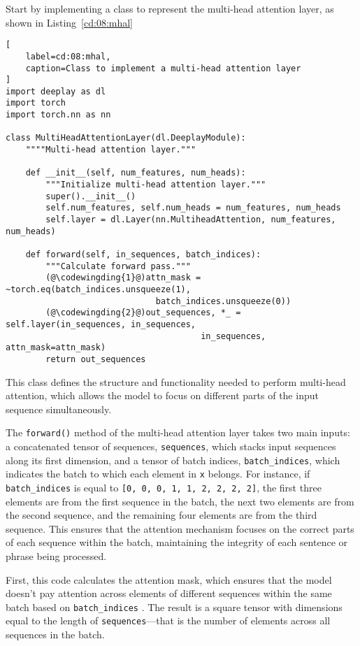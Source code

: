 Start by implementing a class to represent the multi-head attention layer, as shown in Listing~\ref{cd:08:mhal}
\begin{lstlisting}[
    label=cd:08:mhal,
    caption=Class to implement a multi-head attention layer
]
import deeplay as dl
import torch
import torch.nn as nn

class MultiHeadAttentionLayer(dl.DeeplayModule):
    """"Multi-head attention layer."""
    
    def __init__(self, num_features, num_heads):
        """Initialize multi-head attention layer."""
        super().__init__()
        self.num_features, self.num_heads = num_features, num_heads
        self.layer = dl.Layer(nn.MultiheadAttention, num_features, num_heads)

    def forward(self, in_sequences, batch_indices):
        """Calculate forward pass."""
        (@\codewingding{1}@)attn_mask = ~torch.eq(batch_indices.unsqueeze(1), 
                              batch_indices.unsqueeze(0))
        (@\codewingding{2}@)out_sequences, *_ = self.layer(in_sequences, in_sequences, 
                                       in_sequences, attn_mask=attn_mask)
        return out_sequences
\end{lstlisting}
This class defines the structure and functionality needed to perform multi-head attention, which allows the model to focus on different parts of the input sequence simultaneously.

The \lstinline{forward()} method of the  multi-head attention layer takes two main inputs: a concatenated tensor of sequences, \lstinline{sequences}, which stacks input sequences along its first dimension, and a tensor of batch indices, \lstinline{batch_indices}, which indicates the batch to which each element in \lstinline{x} belongs. For instance, if \lstinline{batch_indices} is equal to \lstinline{[0, 0, 0, 1, 1, 2, 2, 2, 2]}, the first three elements are from the first sequence in the batch, the next two elements are from the second sequence, and the remaining four elements are from the third sequence.
This ensures that the attention mechanism focuses on the correct parts of each sequence within the batch, maintaining the integrity of each sentence or phrase being processed.

First, this code calculates the attention mask, which ensures that the model doesn't pay attention across elements of different sequences within the same batch based on \lstinline{batch_indices} . The result is a square tensor with dimensions equal to the length of \lstinline{sequences}---that is the number of elements across all sequences in the batch.


